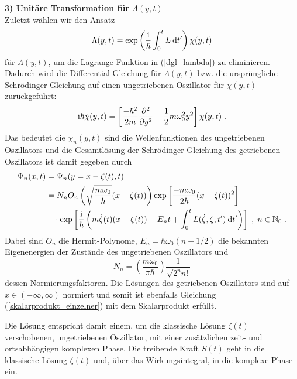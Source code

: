      \textbf{3) Unitäre Transformation für $\Lambda(y,t)$}\\
      Zuletzt wählen wir den Ansatz
      \begin{equation}
        \Lambda(y,t) = \exp\left(\frac{\text i}{\hbar}\int_0^tL \: \text d t'\right)\chi(y,t)
      \end{equation}
      für $\Lambda(y,t)$, um die Lagrange-Funktion in (\ref{dgl_lambda}) zu eliminieren.
      Dadurch wird die Differential-Gleichung für $\Lambda(y,t)$ bzw. die ursprüngliche Schrödinger-Gleichung auf einen ungetriebenen Oszillator für $\chi(y,t)$ zurückgeführt:
      \begin{equation}
        \text i \hbar \dot \chi(y,t) = \left[ \frac{-\hbar^2}{2m}\frac{\partial^2}{\partial y^2} + \frac{1}{2}m\omega_0^2y^2 \right]\chi(y,t) \; .
      \end{equation}
      Das bedeutet die $\chi_n(y,t)$ sind die Wellenfunktionen des ungetriebenen Oszillators und die Gesamtlösung der Schrödinger-Gleichung des getriebenen Oszillators ist damit gegeben durch
      \begin{align}
        \begin{split}
        \Psi_n(x,t) &= \Psi_n(y=x-\zeta(t),t) \\
        &= N_nO_n\left(\sqrt{\frac{m\omega_0}{\hbar}}(x-\zeta(t))\right) \exp\left[\frac{-m\omega_0}{2\hbar}(x-\zeta(t))^2\right] \\
        &\quad \cdot \exp\left[\frac{\text i}{\hbar}\left(m\dot \zeta(t)(x-\zeta(t))-E_nt+\int_0^tL(\dot \zeta,\zeta,t')\:\text dt'\right)\right] \; ,
        \; n \in \mathbb{N}_0 \; .
        \label{gesamtlsg_einzelner}
      \end{split}
      \end{align}
      Dabei sind $O_n$ die Hermit-Polynome, $E_n = \hbar \omega_0(n+1/2)$ die bekannten Eigenenergien der Zustände des ungetriebenen Oszillators und
      \begin{equation}
        N_n = \left(\frac{m\omega_0}{\pi \hbar}\right) \frac{1}{\sqrt{2^nn!}}
      \end{equation}
      dessen Normierungsfaktoren.
      Die Lösungen des getriebenen Oszillators sind auf $x \in (-\infty, \infty)$ normiert und somit ist ebenfalls Gleichung (\ref{skalarprodukt_einzelner}) mit dem Skalarprodukt erfüllt.

      Die Lösung entspricht damit einem, um die klassische Lösung $\zeta(t)$ verschobenen, ungetriebenen Oszillator, mit einer zusätzlichen zeit- und ortsabhängigen komplexen Phase.
      Die treibende Kraft $S(t)$ geht in die klassische Lösung $\zeta(t)$ und, über das Wirkungsintegral, in die komplexe Phase ein.



